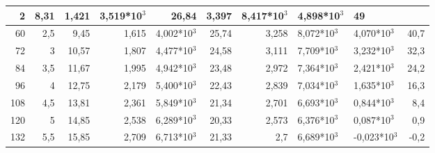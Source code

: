 \begin{table}[H]
{\begin{tabular}{|rr|rrl|rrl|l|r|}
  2 &
  \multicolumn{1}{r|}{8,31} &
  \multicolumn{1}{r|}{1,421} &
  3,519*10$^3$ &
  \multicolumn{1}{r|}{26,84} &
  \multicolumn{1}{r|}{3,397} &
  8,417*10$^3$ &
  4,898*10$^3$ &
  49 \\ \hline
\multicolumn{1}{|r|}{60} &
  2,5 &
  \multicolumn{1}{r|}{9,45} &
  \multicolumn{1}{r|}{1,615} &
  4,002*10$^3$ &
  \multicolumn{1}{r|}{25,74} &
  \multicolumn{1}{r|}{3,258} &
  8,072*10$^3$ &
  4,070*10$^3$ &
  40,7 \\ \hline
\multicolumn{1}{|r|}{72} &
  3 &
  \multicolumn{1}{r|}{10,57} &
  \multicolumn{1}{r|}{1,807} &
  4,477*10$^3$ &
  \multicolumn{1}{r|}{24,58} &
  \multicolumn{1}{r|}{3,111} &
  7,709*10$^3$ &
  3,232*10$^3$ &
  32,3 \\ \hline
\multicolumn{1}{|r|}{84} &
  3,5 &
  \multicolumn{1}{r|}{11,67} &
  \multicolumn{1}{r|}{1,995} &
  4,942*10$^3$ &
  \multicolumn{1}{r|}{23,48} &
  \multicolumn{1}{r|}{2,972} &
  7,364*10$^3$ &
  2,421*10$^3$ &
  24,2 \\ \hline
\multicolumn{1}{|r|}{96} &
  4 &
  \multicolumn{1}{r|}{12,75} &
  \multicolumn{1}{r|}{2,179} &
  5,400*10$^3$ &
  \multicolumn{1}{r|}{22,43} &
  \multicolumn{1}{r|}{2,839} &
  7,034*10$^3$ &
  1,635*10$^3$ &
  16,3 \\ \hline
\multicolumn{1}{|r|}{108} &
  4,5 &
  \multicolumn{1}{r|}{13,81} &
  \multicolumn{1}{r|}{2,361} &
  5,849*10$^3$ &
  \multicolumn{1}{r|}{21,34} &
  \multicolumn{1}{r|}{2,701} &
  6,693*10$^3$ &
  0,844*10$^3$ &
  8,4 \\ \hline
\multicolumn{1}{|r|}{120} &
  5 &
  \multicolumn{1}{r|}{14,85} &
  \multicolumn{1}{r|}{2,538} &
  6,289*10$^3$ &
  \multicolumn{1}{r|}{20,33} &
  \multicolumn{1}{r|}{2,573} &
  6,376*10$^3$ &
  0,087*10$^3$ &
  0,9 \\ \hline
\multicolumn{1}{|r|}{132} &
  5,5 &
  \multicolumn{1}{r|}{15,85} &
  \multicolumn{1}{r|}{2,709} &
  6,713*10$^3$ &
  \multicolumn{1}{r|}{21,33} &
  \multicolumn{1}{r|}{2,7} &
  6,689*10$^3$ &
  -0,023*10$^3$ &
  -0,2 \\ \hline
\end{tabular}%
}
\end{table}

